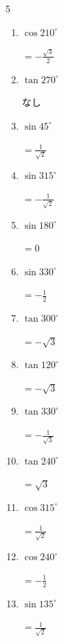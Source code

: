 \begin{multicols}{5}
\begin{enumerate}
  \item $\displaystyle \cos{210^\circ}$

        $\displaystyle =-\frac{\sqrt{3}}{2}$

  \item $\displaystyle \tan{270^\circ}$

        $\displaystyle なし$

  \item $\displaystyle \sin{45^\circ}$

        $\displaystyle =\frac{1}{\sqrt{2}}$

\columnbreak %

  \item $\displaystyle \sin{315^\circ}$

        $\displaystyle =-\frac{1}{\sqrt{2}}$

  \item $\displaystyle \sin{180^\circ}$

        $\displaystyle =0$

  \item $\displaystyle \sin{330^\circ}$

        $\displaystyle =-\frac{1}{2}$

  \item $\displaystyle \tan{300^\circ}$

        $\displaystyle =-\sqrt{3}$

  \item $\displaystyle \tan{120^\circ}$

        $\displaystyle =-\sqrt{3}$

  \item $\displaystyle \tan{330^\circ}$

        $\displaystyle =-\frac{1}{\sqrt{3}}$

  \item $\displaystyle \tan{240^\circ}$

        $\displaystyle =\sqrt{3}$

  \item $\displaystyle \cos{315^\circ}$

        $\displaystyle =\frac{1}{\sqrt{2}}$

  \item $\displaystyle \cos{240^\circ}$

        $\displaystyle =-\frac{1}{2}$

  \item $\displaystyle \sin{135^\circ}$

        $\displaystyle =\frac{1}{\sqrt{2}}$


\end{enumerate}
\end{multicols}
